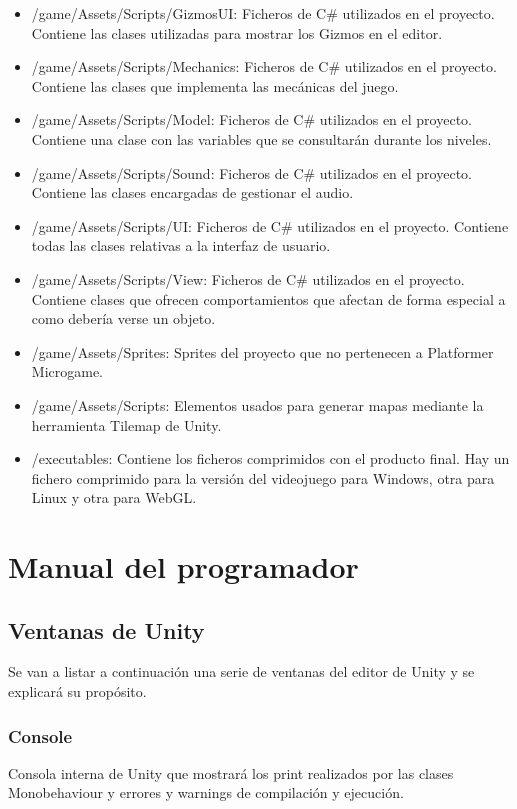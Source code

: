 \begin{itemize}
\item
/game/Assets/Scripts/GizmosUI: Ficheros de C\# utilizados en el proyecto. Contiene las clases utilizadas para mostrar los Gizmos en el editor.
\item
/game/Assets/Scripts/Mechanics: Ficheros de C\# utilizados en el proyecto. Contiene las clases que implementa las mecánicas del juego.
\item
/game/Assets/Scripts/Model: Ficheros de C\# utilizados en el proyecto. Contiene una clase con las variables que se consultarán durante los niveles.
\item
/game/Assets/Scripts/Sound: Ficheros de C\# utilizados en el proyecto. Contiene las clases encargadas de gestionar el audio.
\item
/game/Assets/Scripts/UI: Ficheros de C\# utilizados en el proyecto. Contiene todas las clases relativas a la interfaz de usuario.
\item
/game/Assets/Scripts/View: Ficheros de C\# utilizados en el proyecto. Contiene clases que ofrecen comportamientos que afectan de forma especial a como debería verse un objeto.
\item
/game/Assets/Sprites: Sprites del proyecto que no pertenecen a Platformer Microgame.
\item
/game/Assets/Scripts: Elementos usados para generar mapas mediante la herramienta Tilemap de Unity.
\item
/executables: Contiene los ficheros comprimidos con el producto final. Hay un fichero comprimido para la versión del videojuego para Windows, otra para Linux y otra para WebGL.
\end{itemize}

\section{Manual del programador}
\subsection{Ventanas de Unity}
Se van a listar a continuación una serie de ventanas del editor de Unity y se explicará su propósito.

\subsubsection{Console}
Consola interna de Unity que mostrará los print realizados por las clases Monobehaviour y errores y warnings de compilación y ejecución.


